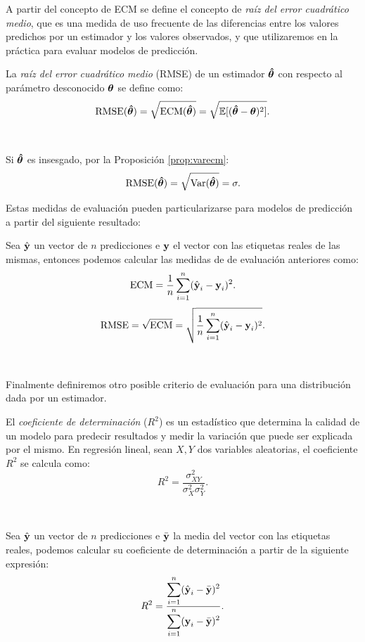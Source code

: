 \documentclass[oneside,openright,titlepage,numbers=noenddot,openany,headinclude,footinclude=true,
cleardoublepage=empty,abstractoff,BCOR=5mm,paper=a4,fontsize=12pt,main=spanish]{scrreprt}
\begin{document}
A partir del concepto de ECM se define el concepto de \textit{raíz del error cuadrático medio}, que es una medida de uso frecuente de las diferencias entre los valores predichos por un estimador y los valores observados, y que utilizaremos en la práctica para evaluar modelos de predicción.\\

\begin{definition}
La \textit{raíz del error cuadrático medio} (RMSE) de un estimador $\bm{\hat{\theta}}$ con respecto al parámetro desconocido $\bm{\theta}$ se define como: $$\text{RMSE}(\bm{\hat{\theta}})=\sqrt{\text{ECM}(\bm{\hat{\theta}})}=\sqrt{\mathbb{E}[(\bm{\hat{\theta}}-\bm{\theta})^2]}.$$
\end{definition}\

\begin{remark}
Si $\bm{\hat{\theta}}$ es insesgado, por la Proposición \ref{prop:varecm}: $$\text{RMSE}(\bm{\hat{\theta}})=\sqrt{\text{Var}(\bm{\hat{\theta}})}=\sigma.$$
\end{remark}

Estas medidas de evaluación pueden particularizarse para modelos de predicción a partir del siguiente resultado:\\

\begin{proposition}
Sea $\hat{\textbf{y}}$ un vector de $n$ predicciones e $\textbf{y}$ el vector con las etiquetas reales de las mismas, entonces podemos calcular las medidas de de evaluación anteriores como: $$\text{ECM}=\frac{1}{n}\sum_{i=1}^n (\hat{\textbf{y}}_i-\textbf{y}_i)^2.$$ $$\text{RMSE}=\sqrt{\text{ECM}}=\sqrt{\frac{1}{n}\sum_{i=1}^n (\hat{\textbf{y}}_i-\textbf{y}_i)^2}.$$
\end{proposition}\

Finalmente definiremos otro posible criterio de evaluación para una distribución dada por un estimador.\\

\begin{definition}
El \textit{coeficiente de determinación} ($R^2$) es un estadístico que determina la calidad de un modelo para predecir resultados y medir la variación que puede ser explicada por el mismo. En regresión lineal, sean $X,Y$ dos variables aleatorias, el coeficiente $R^2$ se calcula como: $$R^2=\frac{\sigma^2_{XY}}{\sigma^2_X \sigma^2_Y}.$$
\end{definition}\

\begin{proposition}
Sea $\hat{\textbf{y}}$ un vector de $n$ predicciones e $\bar{\textbf{y}}$ la media del vector con las etiquetas reales, podemos calcular su coeficiente de determinación a partir de la siguiente expresión: $$R^2=\frac{\displaystyle \sum_{i=1}^n (\hat{\textbf{y}}_i-\bar{\textbf{y}})^2}{\displaystyle \sum_{i=1}^n (\textbf{y}_i-\bar{\textbf{y}})^2}.$$
\end{proposition}
\end{document}
